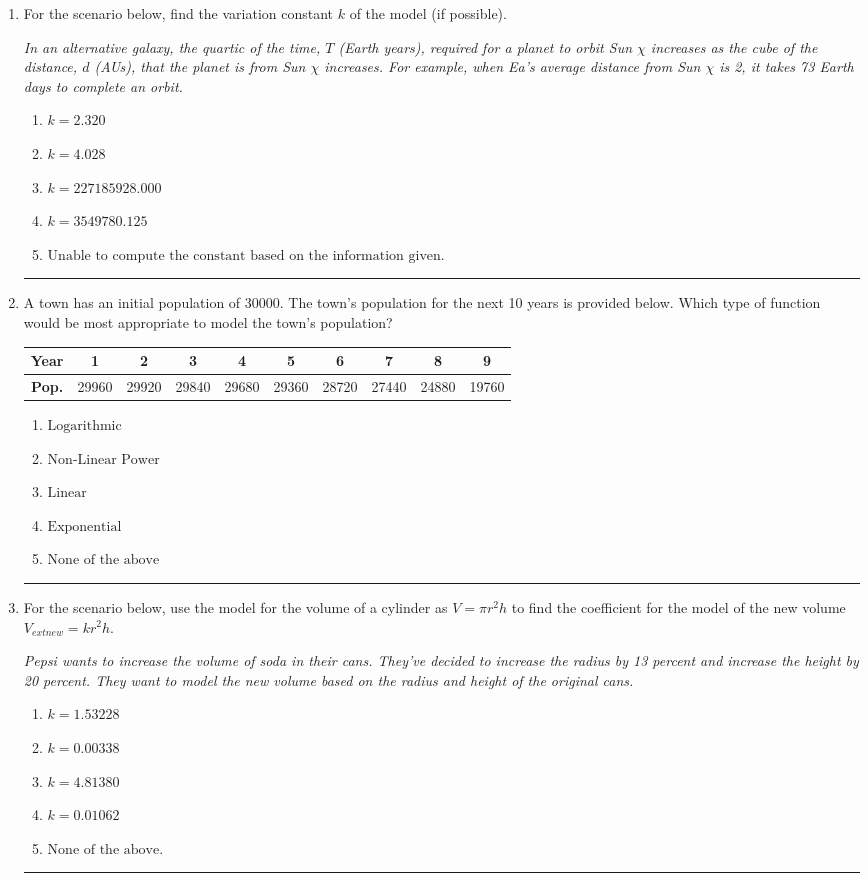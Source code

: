 \documentclass[14pt]{extbook}
\newcommand{\litem}[1]{\item#1\hspace*{-1cm}\rule{\textwidth}{0.4pt}}
\begin{document}
\begin{enumerate}
\litem{
For the scenario below, find the variation constant $k$ of the model (if possible).
\begin{center}
    \textit{ In an alternative galaxy, the quartic of the time, $T$ (Earth years), required for a planet to orbit Sun $\chi$ increases as the cube of the distance, $d$ (AUs), that the planet is from Sun $\chi$ increases. For example, when Ea's average distance from Sun $\chi$ is 2, it takes 73 Earth days to complete an orbit. }
\end{center}
\begin{enumerate}[label=\Alph*.]
\item \( k = 2.320 \)
\item \( k = 4.028 \)
\item \( k = 227185928.000 \)
\item \( k = 3549780.125 \)
\item \( \text{Unable to compute the constant based on the information given.} \)

\end{enumerate} }
\litem{
A town has an initial population of 30000. The town's population for the next 10 years is provided below. Which type of function would be most appropriate to model the town's population?


\begin{tabular}{c|c|c|c|c|c|c|c|c|c}
\textbf{Year} & 1 & 2 & 3 & 4 & 5 & 6 & 7 & 8 & 9 \tabularnewline
\hline
\textbf{Pop.} & 29960 & 29920 & 29840 & 29680 & 29360 & 28720 & 27440 & 24880 & 19760
\end{tabular} \begin{enumerate}[label=\Alph*.]
\item \( \text{Logarithmic} \)
\item \( \text{Non-Linear Power} \)
\item \( \text{Linear} \)
\item \( \text{Exponential} \)
\item \( \text{None of the above} \)

\end{enumerate} }
\litem{
For the scenario below, use the model for the volume of a cylinder as $V = \pi r^2 h$ to find the coefficient for the model of the new volume $V_{	ext{new}} = k r^2 h$.
\begin{center}
    \textit{ Pepsi wants to increase the volume of soda in their cans. They've decided to increase the radius by 13 percent and increase the height by 20 percent. They want to model the new volume based on the radius and height of the original cans. }
\end{center}
\begin{enumerate}[label=\Alph*.]
\item \( k = 1.53228 \)
\item \( k = 0.00338 \)
\item \( k = 4.81380 \)
\item \( k = 0.01062 \)
\item \( \text{None of the above.} \)


\end{enumerate}}
\end{enumerate}
\end{document}
